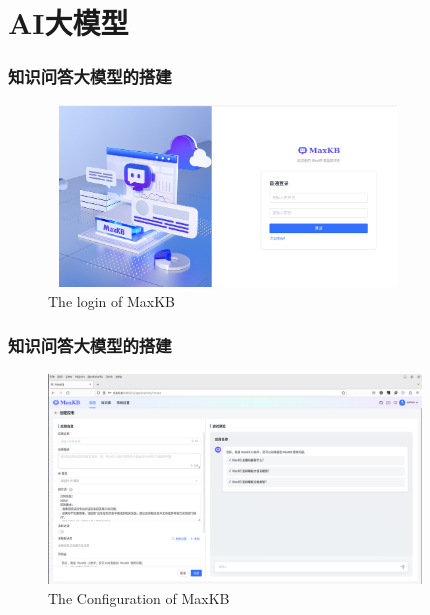 \section{\rm{AI}大模型}
\begin{frame}
	\frametitle{知识问答大模型的搭建}
\begin{figure}[h!]
\centering
\vskip -8pt
\includegraphics[height=1.90in,width=3.75in,viewport=0 0 1409 750,clip]{Figures/MaxKB_login.png}
\caption{\tiny\textrm{The login of MaxKB}}%
\label{Fig:MaxKB_login}
\end{figure}
{\fontsize{7.5pt}{6.0pt}}
\end{frame}

\begin{frame}
	\frametitle{知识问答大模型的搭建}
\begin{figure}[h!]
\centering
\vskip -8pt
\includegraphics[height=2.2in,width=3.90in,viewport=3 0 1848 1041,clip]{Figures/MaxKB_Creat-APP.png}
\caption{\tiny\textrm{The Configuration of MaxKB}}%
\label{Fig:MaxKB_Creat-APP}
\end{figure}
\end{frame}

